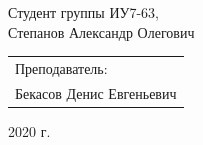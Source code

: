 \begin{titlepage}
\begin{center}
        Студент группы ИУ7-63,\\
        Степанов Александр Олегович
        \vfill
    \end{center}

    \begin{flushright}
        \large
        \begin{tabular}{l}
            Преподаватель: \\
            Бекасов Денис Евгеньевич \\
        \end{tabular}
    \end{flushright}

   \begin{center}
        2020 г.
    \end{center}

\end{titlepage}

\tableofcontents
